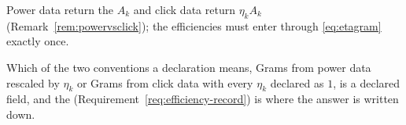 
Power data return the  $A_k$ and click data return $\eta_kA_k$
(Remark~\ref{rem:powervsclick}); the efficiencies must enter through
\eqref{eq:etagram} exactly once.

\begin{requirement}\label{req:efficiency-convention}
Which of the two conventions a declaration means, Grams from power data
rescaled by $\eta_k$ or Grams from click data with every $\eta_k$ declared as
$1$, is a declared field, and the 
(Requirement~\ref{req:efficiency-record}) is where the answer is written down.
\end{requirement}
